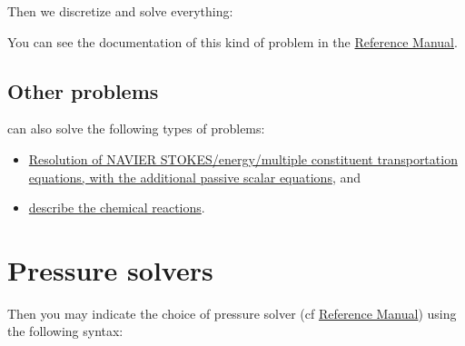 Then we discretize and solve everything:
\begin{center}
\end{center}

You can see the documentation of this kind of problem in the \href{\REFERENCEMANUAL\#coupledproblem}{\trustref Reference Manual}.



\subsection{Other problems}
\trust can also solve the following types of problems:
\begin{itemize}
\item \href{\REFERENCEMANUAL\#pbthermohydrauliqueconcentrationscalairespassifs}{Resolution of NAVIER STOKES/energy/multiple constituent transportation equations, with the additional passive scalar equations}, and
\item \href{\REFERENCEMANUAL\#chimie}{describe the chemical reactions}.
\end{itemize}



\section{Pressure solvers}
Then you may indicate the choice of pressure solver (cf \href{\REFERENCEMANUAL\#solveursysbase}{\trustref Reference Manual}) using the following syntax:
    \begin{center}
    \end{center}

